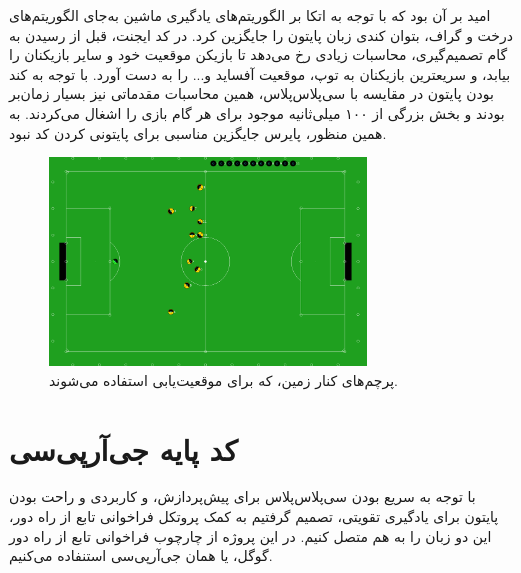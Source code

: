 امید بر آن بود که با توجه به اتکا بر الگوریتم‌های یادگیری ماشین به‌جای الگوریتم‌های درخت و گراف، بتوان کندی زبان پایتون را جایگزین کرد.
در کد ایجنت،
قبل از رسیدن به گام تصمیم‌گیری، محاسبات زیادی رخ می‌دهد تا بازیکن موقعیت خود و سایر بازیکنان را بیابد، و سریعترین بازیکنان به توپ، موقعیت آفساید و... را به دست آورد.
با توجه به کند بودن پایتون در مقایسه با سی‌پلاس‌پلاس،
همین محاسبات مقدماتی نیز بسیار زمان‌بر بودند و بخش بزرگی از ۱۰۰ میلی‌ثانیه موجود برای هر گام بازی را اشغال می‌کردند.
به همین منظور، پایرس جایگزین مناسبی برای پایتونی کردن کد نبود.

\begin{figure}[H]
    \centering
    \includegraphics[width=0.75\textwidth]{images/flags.png}
    \caption{پرچم‌های کنار زمین، که برای موقعیت‌یابی استفاده می‌شوند.}\label{fig:flags}
    
\end{figure}

\section{کد پایه جی‌آر‌پی‌سی}
با توجه به سریع بودن سی‌پلاس‌پلاس 
برای پیش‌پردازش،
و کاربردی و راحت بودن پایتون برای یادگیری تقویتی،
تصمیم گرفتیم به کمک پروتکل فراخوانی تابع از راه دور،
این دو زبان را به هم متصل کنیم.
 در این پروژه از چارچوب فراخوانی تابع از راه دور گوگل، یا همان جی‌آر‌پی‌سی
 استنفاده می‌کنیم.

